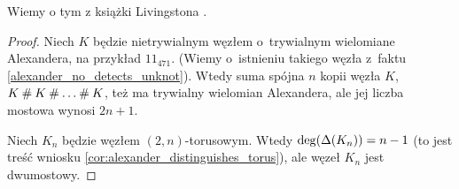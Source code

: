 Wiemy o tym z książki Livingstona \cite[s. 145]{livingston93}.

\begin{proof}
    Niech $K$ będzie nietrywialnym węzłem o~trywialnym wielomiane Alexandera, na przykład $11_{471}$.
    (Wiemy o~istnieniu takiego węzła z~faktu \ref{alexander_no_detects_unknot}).
    Wtedy suma spójna $n$ kopii węzła $K$, $K \mathbin{\#} K \mathbin{\#} \ldots \mathbin{\#} K$, też ma trywialny wielomian Alexandera, ale jej liczba mostowa wynosi $2n + 1$.

    Niech $K_n$ będzie węzłem $(2, n)$-torusowym.
    Wtedy $\deg (\Delta(K_n)) = n-1$ (to jest treść wniosku \ref{cor:alexander_distinguishes_torus}), ale węzeł $K_n$ jest dwumostowy.
\end{proof}


